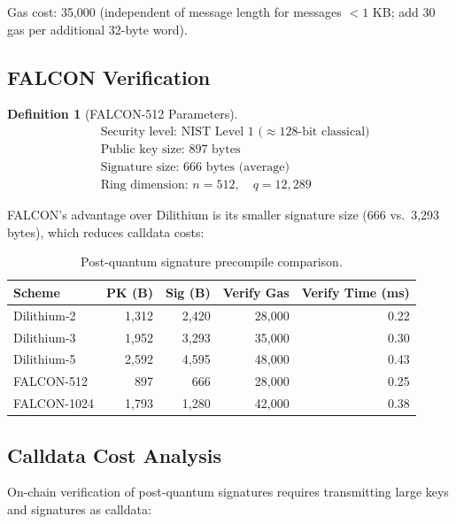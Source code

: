 \documentclass[11pt,a4paper]{article}
\newtheorem{definition}{Definition}
\begin{document}
Gas cost: 35,000 (independent of message length for messages $< 1$ KB; add 30 gas per additional 32-byte word).

\subsection{FALCON Verification}

\begin{definition}[FALCON-512 Parameters]
\begin{align}
    &\text{Security level: NIST Level 1 ($\approx 128$-bit classical)} \\
    &\text{Public key size: } 897 \text{ bytes} \\
    &\text{Signature size: } 666 \text{ bytes (average)} \\
    &\text{Ring dimension: } n = 512, \quad q = 12{,}289
\end{align}
\end{definition}

FALCON's advantage over Dilithium is its smaller signature size (666 vs.\ 3,293 bytes), which reduces calldata costs:

\begin{table}[H]
\centering
\caption{Post-quantum signature precompile comparison.}
\label{tab:pq_comparison}
\begin{tabular}{lrrrr}
\toprule
\textbf{Scheme} & \textbf{PK (B)} & \textbf{Sig (B)} & \textbf{Verify Gas} & \textbf{Verify Time (ms)} \\
\midrule
Dilithium-2 & 1,312 & 2,420 & 28,000 & 0.22 \\
Dilithium-3 & 1,952 & 3,293 & 35,000 & 0.30 \\
Dilithium-5 & 2,592 & 4,595 & 48,000 & 0.43 \\
FALCON-512 & 897 & 666 & 28,000 & 0.25 \\
FALCON-1024 & 1,793 & 1,280 & 42,000 & 0.38 \\
\bottomrule
\end{tabular}
\end{table}

\subsection{Calldata Cost Analysis}

On-chain verification of post-quantum signatures requires transmitting large keys and signatures as calldata:
\end{document}
